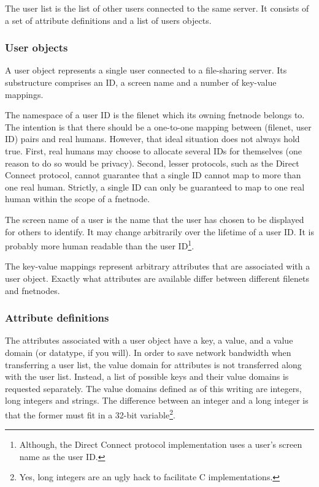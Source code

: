 \documentclass[twoside,a4paper,11pt]{article}
\begin{document}
The user list is the list of other users connected to the same
server. It consists of a set of attribute definitions and a list of
users objects.

\subsubsection{User objects}
A user object represents a single user connected to a file-sharing
server. Its substructure comprises an ID, a screen name and a number
of key-value mappings.

The namespace of a user ID is the filenet which its owning fnetnode
belongs to. The intention is that there should be a one-to-one mapping
between (filenet, user ID) pairs and real humans. However, that ideal
situation does not always hold true. First, real humans may choose to
allocate several IDs for themselves (one reason to do so would be
privacy). Second, lesser protocols, such as the Direct Connect
protocol, cannot guarantee that a single ID cannot map to more than
one real human. Strictly, a single ID can only be guaranteed to map to
one real human within the scope of a fnetnode.

The screen name of a user is the name that the user has chosen to be
displayed for others to identify. It may change arbitrarily over the
lifetime of a user ID. It is probably more human readable than the
user ID\footnote{Although, the Direct Connect protocol implementation
  uses a user's screen name as the user ID.}.

The key-value mappings represent arbitrary attributes that are
associated with a user object. Exactly what attributes are available
differ between different filenets and fnetnodes.

\subsubsection{Attribute definitions}
The attributes associated with a user object have a key, a value, and
a value domain (or datatype, if you will). In order to save network
bandwidth when transferring a user list, the value domain for
attributes is not transferred along with the user list. Instead, a
list of possible keys and their value domains is requested
separately. The value domains defined as of this writing are integers,
long integers and strings. The difference between
an integer and a long integer is that the former must fit in a 32-bit
variable\footnote{Yes, long integers are an ugly hack to
  facilitate C implementations.}.
\end{document}
